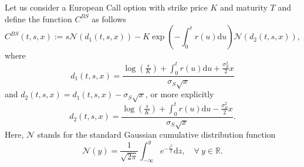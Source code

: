 \documentclass[12pt,centertags,reqno]{amsart}
\numberwithin{equation}{section} \makeatletter
\def \F {\mathcal F}
\def \P {\mathbf P}
\def \R {\mathbb R}
\newcommand{\ud}{\mathrm d}
\newcommand{\espbar}[2][\mathbb E^{\bar \P}] {#1\left[#2\right]}
\begin{document}
Let us consider a European Call option with strike price $K$ and maturity $T$ and define the function $C^{BS}$ as follows
\begin{equation} \label{def:pricing_function}
C^{BS}(t,s,x):=s\mathcal N(d_1(t,s,x)) - K\exp\left(-\int_0^t r(u) \ud u\right)\mathcal N(d_2(t,s,x)),
\end{equation}
where
\begin{equation} \label{def:d1}
d_1(t,s,x)=\frac{\log\left(\frac{s}{K}\right) + \int_0^t r(u)\ud u + \frac{\sigma_S^2}{2}x}{\sigma_S \sqrt{x}}
\end{equation}
and $d_2(t,s,x)=d_1(t,s,x)-\sigma_S \sqrt{x}$, or more explicitly
\begin{equation} \label{def:d2}
d_2(t,s,x)=\frac{\log\left(\frac{s}{K}\right) + \int_0^t r(u)\ud u - \frac{\sigma_S^2}{2}x}{\sigma_S \sqrt{x}}.
\end{equation}
Here, $\mathcal N$ stands for the standard Gaussian cumulative distribution function
$$
\mathcal N(y)=\frac{1}{\sqrt{2\pi}} \int_{-\infty}^{y} e^{-\frac{z^2}{2}}\ud z, \quad \forall\ y \in \R.
$$
\end{document}

